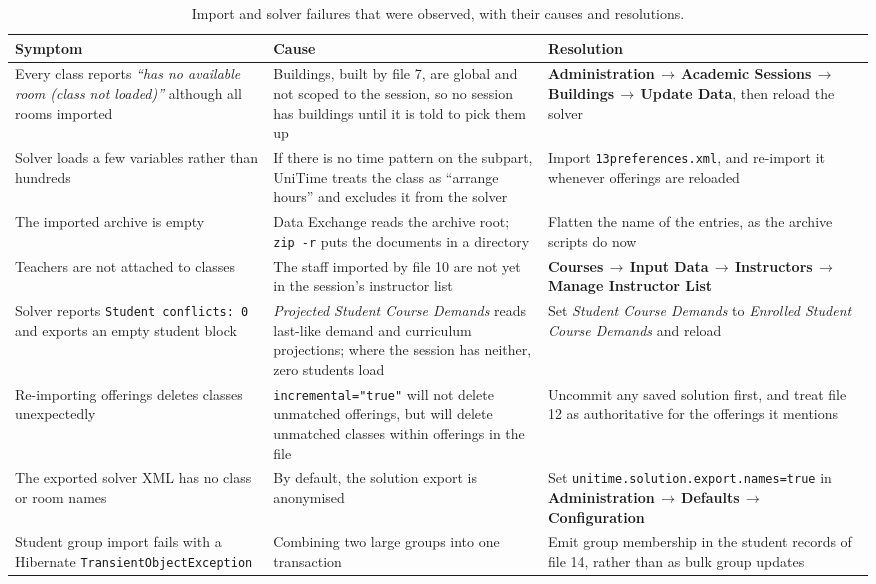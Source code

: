 \begin{table}[H]
\centering
\caption{Import and solver failures that were observed, with their causes and resolutions.}
\label{tab:debug}
\footnotesize
\begin{tabular}{@{}L{4.0cm}L{5.4cm}L{5.4cm}@{}}
\toprule
\textbf{Symptom} & \textbf{Cause} & \textbf{Resolution} \\
\midrule
Every class reports \emph{``has no available room (class not loaded)''} although all rooms imported
  & Buildings, built by file 7, are global and not scoped to the session, so no session has buildings
    until it is told to pick them up
  & \textbf{Administration\,$\rightarrow$\,Academic Sessions\,$\rightarrow$\,Buildings\,$\rightarrow$\,Update Data}, then reload the solver \\
Solver loads a few variables rather than hundreds
  & If there is no time pattern on the subpart, UniTime treats the class as ``arrange hours'' and excludes
    it from the solver
  & Import \texttt{13preferences.xml}, and re-import it whenever offerings are reloaded \\
The imported archive is empty
  & Data Exchange reads the archive root; \texttt{zip -r} puts the documents in a directory
  & Flatten the name of the entries, as the archive scripts do now \\
Teachers are not attached to classes
  & The staff imported by file 10 are not yet in the session's instructor list
  & \textbf{Courses\,$\rightarrow$\,Input Data\,$\rightarrow$\,Instructors\,$\rightarrow$\,Manage Instructor List} \\
Solver reports \texttt{Student conflicts: 0} and exports an empty student block
  & \emph{Projected Student Course Demands} reads last-like demand and curriculum projections;
    where the session has neither, zero students load
  & Set \emph{Student Course Demands} to \emph{Enrolled Student Course Demands} and reload \\
Re-importing offerings deletes classes unexpectedly
  & \texttt{incremental="true"} will not delete unmatched offerings, but will delete unmatched
    classes within offerings in the file
  & Uncommit any saved solution first, and treat file 12 as authoritative for the offerings it mentions \\
The exported solver XML has no class or room names
  & By default, the solution export is anonymised
  & Set \texttt{unitime.solution.export.names=true} in
    \textbf{Administration\,$\rightarrow$\,Defaults\,$\rightarrow$\,Configuration} \\
Student group import fails with a Hibernate \texttt{TransientObjectException}
  & Combining two large groups into one transaction
  & Emit group membership in the student records of file 14, rather than as bulk group updates \\
\bottomrule
\end{tabular}
\end{table}

